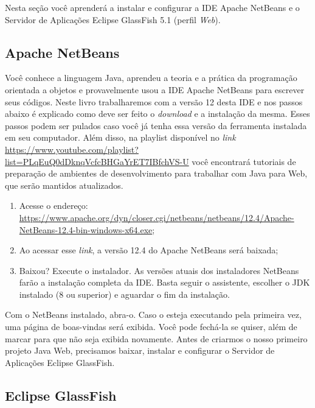 Nesta seção você aprenderá a instalar e configurar a IDE Apache NetBeans e o Servidor de Aplicações Eclipse GlassFish 5.1 (perfil \textit{Web}).


\subsection{Apache NetBeans}

Você conhece a linguagem Java, aprendeu a teoria e a prática da programação orientada a objetos e provavelmente usou a IDE Apache NetBeans para escrever seus códigos. Neste livro trabalharemos com a versão 12 desta IDE e nos passos abaixo é explicado como deve ser feito o \textit{download} e a instalação da mesma. Esses passos podem ser pulados caso você já tenha essa versão da ferramenta instalada em seu computador. Além disso, na playlist disponível no \textit{link} \url{https://www.youtube.com/playlist?list=PLqEuQ0dDknqVcfcBHGaYrET7IBfchVS-U} você encontrará tutoriais de preparação de ambientes de desenvolvimento para trabalhar com Java para Web, que serão mantidos atualizados.

\begin{enumerate}

    \item Acesse o endereço: \url{https://www.apache.org/dyn/closer.cgi/netbeans/netbeans/12.4/Apache-NetBeans-12.4-bin-windows-x64.exe};
    
    \item Ao acessar esse \textit{link}, a versão 12.4 do Apache NetBeans será baixada;
    
    \item Baixou? Execute o instalador. As versões atuais dos instaladores NetBeans farão a instalação completa da IDE. Basta seguir o assistente, escolher o JDK instalado (8 ou superior) e aguardar o fim da instalação.
    
\end{enumerate}

Com o NetBeans instalado, abra-o. Caso o esteja executando pela primeira vez, uma página de boas-vindas será exibida. Você pode fechá-la se quiser, além de marcar para que não seja exibida novamente. Antes de criarmos o nosso primeiro projeto Java Web, precisamos baixar, instalar e configurar o Servidor de Aplicações Eclipse GlassFish.


\subsection{Eclipse GlassFish}

